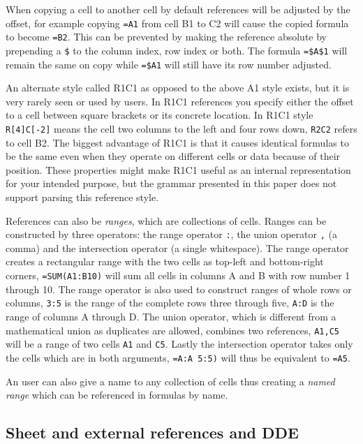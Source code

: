 \documentclass[conference]{IEEEtran}
\begin{document}
When copying a cell to another cell by default references will be adjusted by the offset, for example copying \texttt{=A1} from cell B1 to C2 will cause the copied formula to become \texttt{=B2}.
This can be prevented by making the reference absolute by prepending a \texttt{\$} to the column index, row index or both.
The formula \texttt{=\$A\$1} will remain the same on copy while \texttt{=\$A1} will still have its row number adjusted.

An alternate style called R1C1 as opposed to the above A1 style exists, but it is very rarely seen or used by users.
In R1C1 references you specify either the offset to a cell between square brackets or its concrete location.
In R1C1 style \texttt{R[4]C[-2]} means the cell two columns to the left and four rows down, \texttt{R2C2} refers to cell B2.
The biggest advantage of R1C1 is that it causes identical formulas to be the same even when they operate on different cells or data because of their position.
These properties might make R1C1 useful as an internal representation for your intended purpose, but the grammar presented in this paper does not support parsing this reference style.

References can also be \emph{ranges}, which are collections of cells.
Ranges can be constructed by three operators: the range operator \texttt{:}, the union operator \texttt{,} (a comma) and the intersection operator \texttt{} (a single whitespace).
The range operator creates a rectangular range with the two cells as top-left and bottom-right corners, \texttt{=SUM(A1:B10)} will sum all cells in columns A and B with row number 1 through 10.
The range operator is also used to construct ranges of whole rows or columns, \texttt{3:5} is the range of the complete rows three through five, \texttt{A:D} is the range of columns A through D.
The union operator, which is different from a mathematical union as duplicates are allowed, combines two references, \texttt{A1,C5} will be a range of two cells \texttt{A1} and \texttt{C5}.
Lastly the intersection operator takes only the cells which are in both arguments, \texttt{=A:A 5:5)} will thus be equivalent to \texttt{=A5}.

An user can also give a name to any collection of cells thus creating a \emph{named range} which can be referenced in formulas by name.

\subsection{Sheet and external references and DDE}
\end{document}
